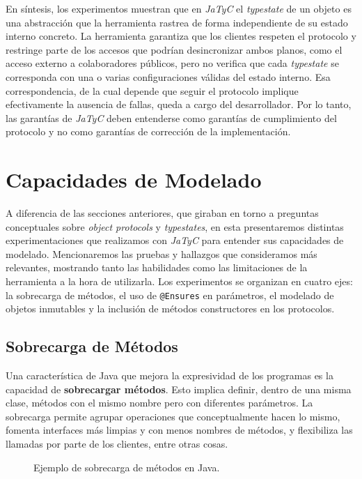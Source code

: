 En síntesis, los experimentos muestran que en \textit{JaTyC} el \textit{typestate} de un objeto es una abstracción que la herramienta rastrea de forma independiente de su estado interno concreto. La herramienta garantiza que los clientes respeten el protocolo y restringe parte de los accesos que podrían desincronizar ambos planos, como el acceso externo a colaboradores públicos, pero no verifica que cada \textit{typestate} se corresponda con una o varias configuraciones válidas del estado interno. Esa correspondencia, de la cual depende que seguir el protocolo implique efectivamente la ausencia de fallas, queda a cargo del desarrollador. Por lo tanto, las garantías de \textit{JaTyC} deben entenderse como garantías de cumplimiento del protocolo y no como garantías de corrección de la implementación.

\section{Capacidades de Modelado}

A diferencia de las secciones anteriores, que giraban en torno a preguntas conceptuales sobre \textit{object protocols} y \textit{typestates}, en esta presentaremos distintas experimentaciones que realizamos con \textit{JaTyC} para entender sus capacidades de modelado. Mencionaremos las pruebas y hallazgos que consideramos más relevantes, mostrando tanto las habilidades como las limitaciones de la herramienta a la hora de utilizarla. Los experimentos se organizan en cuatro ejes: la sobrecarga de métodos, el uso de \texttt{@Ensures} en parámetros, el modelado de objetos inmutables y la inclusión de métodos constructores en los protocolos.

\subsection{Sobrecarga de Métodos}

Una característica de Java que mejora la expresividad de los programas es la capacidad de \textbf{sobrecargar métodos}. Esto implica definir, dentro de una misma clase, métodos con el mismo nombre pero con diferentes parámetros. La sobrecarga permite agrupar operaciones que conceptualmente hacen lo mismo, fomenta interfaces más limpias y con menos nombres de métodos, y flexibiliza las llamadas por parte de los clientes, entre otras cosas.

\begin{figure}[htbp]
    \centering
    
    \caption{Ejemplo de sobrecarga de métodos en Java.}
    \label{exp:overload:example}
\end{figure}

